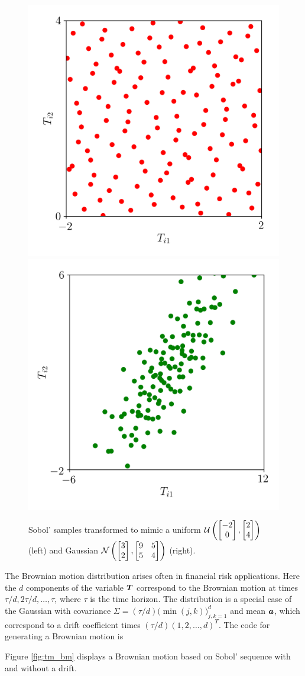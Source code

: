 \documentclass[graybox,footinfo]{svmult}
\newcommand{\mSigma}{\mathsf{\Sigma}}
\begin{document}
\begin{figure}
	\includegraphics[width=.45\textwidth]{QMCSoftwareArticle/figs/tm_uniform.png} 
	\includegraphics[width=.45\textwidth]{QMCSoftwareArticle/figs/tm_gaussian.png}
	\caption{Sobol' samples transformed to mimic a uniform ${\mathcal{U}}\left(\begin{bmatrix} -2 \\ 0 \end{bmatrix}, \begin{bmatrix} 2 \\ 4 \end{bmatrix} \right)$ (left) and  Gaussian ${\mathcal{N}}\left(\begin{bmatrix} 3 \\ 2 \end{bmatrix}, \begin{bmatrix} 9 & 5 \\ 5 & 4 \end{bmatrix} \right)$ (right).}
	\label{fig:tm_ug}
\end{figure}

The Brownian motion distribution arises often in financial risk applications.  Here the $d$ components of the variable ${\boldsymbol{T}}$ correspond to the Brownian motion at times $\tau/d, 2\tau/d, \ldots, \tau$, where $\tau$ is the time horizon.  The distribution is a special case of the Gaussian with covariance $\mSigma = (\tau/d) \bigl (\min(j,k) \bigr)_{j,k=1}^d$ and mean ${\boldsymbol{a}}$, which  correspond to a drift coefficient times $(\tau/d)(1, 2, \ldots, d)^T$. The code for generating a Brownian motion is

Figure \ref{fig:tm_bm} displays a Brownian motion based on Sobol' sequence with and without a drift.
\end{document}
